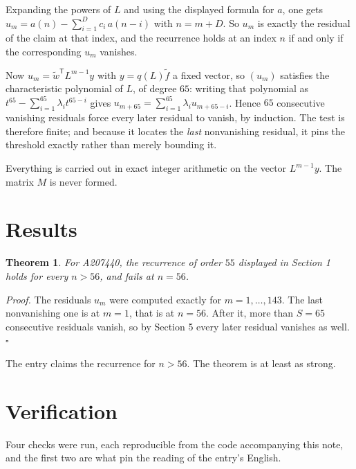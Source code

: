 \documentclass[11pt]{article}
\newtheorem{theorem}{Theorem}
\theoremstyle{definition}
\begin{document}
Expanding the powers of $L$ and using the displayed formula for $a$, one gets $u_m = a(n) - \sum_{i=1}^{D} c_i\,a(n-i)$ with $n = m + D$. So $u_m$ is exactly the residual of the claim at that index, and the recurrence holds at an index $n$ if and only if the corresponding $u_m$ vanishes.

Now $u_m = \tilde w^{\mathsf T} L^{m-1} y$ with $y = q(L)\tilde f$ a fixed vector, so $(u_m)$ satisfies the characteristic polynomial of $L$, of degree $65$: writing that polynomial as $t^{65} - \sum_{i=1}^{65} \lambda_i t^{65-i}$ gives $u_{m+65} = \sum_{i=1}^{65} \lambda_i u_{m+65-i}$. Hence $65$ consecutive vanishing residuals force every later residual to vanish, by induction. The test is therefore finite; and because it locates the {\itshape last} nonvanishing residual, it pins the threshold exactly rather than merely bounding it.

Everything is carried out in exact integer arithmetic on the vector $L^{m-1}y$. The matrix $M$ is never formed.

\section{Results}

\begin{theorem} For A207440, the recurrence of order $55$ displayed in Section 1 holds for every $n > 56$, and fails at $n = 56$.\end{theorem}

{\itshape Proof.} The residuals $u_m$ were computed exactly for $m = 1,\dots,143$. The last nonvanishing one is at $m = 1$, that is at $n = 56$. After it, more than $S = 65$ consecutive residuals vanish, so by Section 5 every later residual vanishes as well. $\square$

The entry claims the recurrence for $n > 56$. The theorem is at least as strong.

\section{Verification}

Four checks were run, each reproducible from the code accompanying this note, and the first two are what pin the reading of the entry's English.
\end{document}
